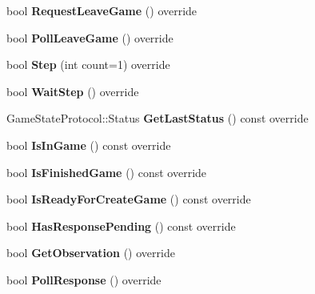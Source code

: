 \begin{DoxyCompactItemize}
bool {\bfseries Request\+Leave\+Game} () override
\item 
\mbox{\label{classsc2_1_1_control_imp_aac530bdb09fa95b5221bbc4ffdd4527f}} 
bool {\bfseries Poll\+Leave\+Game} () override
\item 
\mbox{\label{classsc2_1_1_control_imp_a5b47f5188766afacd5af87320f08b81c}} 
bool {\bfseries Step} (int count=1) override
\item 
\mbox{\label{classsc2_1_1_control_imp_ad11cb8cf85d9c073c5100e94203aa317}} 
bool {\bfseries Wait\+Step} () override
\item 
\mbox{\label{classsc2_1_1_control_imp_a6946b7364e9d29d48c3bc8c5711fa561}} 
Game\+State\+Protocol\+::\+Status {\bfseries Get\+Last\+Status} () const override
\item 
\mbox{\label{classsc2_1_1_control_imp_a41dfdf25c86c52865cabd0dc1bc3ff8c}} 
bool {\bfseries Is\+In\+Game} () const override
\item 
\mbox{\label{classsc2_1_1_control_imp_a5416c9318c4e05eb541f6383dfc0bb1d}} 
bool {\bfseries Is\+Finished\+Game} () const override
\item 
\mbox{\label{classsc2_1_1_control_imp_ac76c8b7420ccd8fecdc83ad393d3bde0}} 
bool {\bfseries Is\+Ready\+For\+Create\+Game} () const override
\item 
\mbox{\label{classsc2_1_1_control_imp_a4a44a7886b3e32b12b6da8fe27b73991}} 
bool {\bfseries Has\+Response\+Pending} () const override
\item 
\mbox{\label{classsc2_1_1_control_imp_a667b1c981e3acb582f8d7babfdcfd10e}} 
bool {\bfseries Get\+Observation} () override
\item 
\mbox{\label{classsc2_1_1_control_imp_af205406aca81733e814876f9b86ef819}} 
bool {\bfseries Poll\+Response} () override
\end{DoxyCompactItemize}
